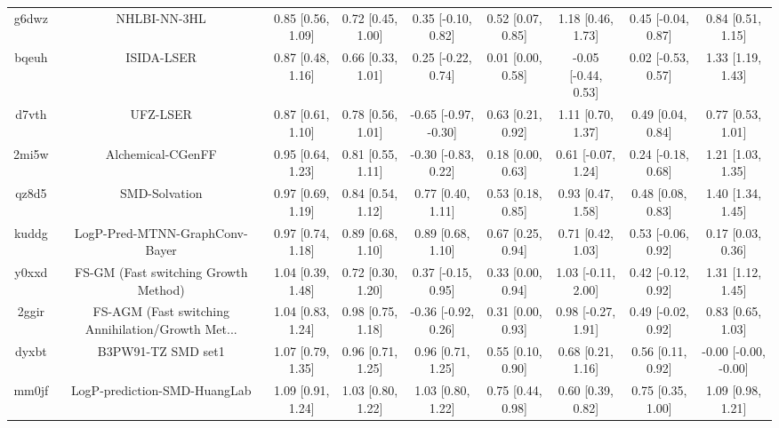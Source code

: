 \documentclass{article}
\begin{document}
\begin{center}
\begin{longtable}{|ccccccccc|}
 g6dwz &                                       NHLBI-NN-3HL &  0.85 [0.56, 1.09] &  0.72 [0.45, 1.00] &    0.35 [-0.10, 0.82] &  0.52 [0.07, 0.85] &    1.18 [0.46, 1.73] &   0.45 [-0.04, 0.87] &     0.84 [0.51, 1.15] \\
 bqeuh &                                         ISIDA-LSER &  0.87 [0.48, 1.16] &  0.66 [0.33, 1.01] &    0.25 [-0.22, 0.74] &  0.01 [0.00, 0.58] &  -0.05 [-0.44, 0.53] &   0.02 [-0.53, 0.57] &     1.33 [1.19, 1.43] \\
 d7vth &                                           UFZ-LSER &  0.87 [0.61, 1.10] &  0.78 [0.56, 1.01] &  -0.65 [-0.97, -0.30] &  0.63 [0.21, 0.92] &    1.11 [0.70, 1.37] &    0.49 [0.04, 0.84] &     0.77 [0.53, 1.01] \\
 2mi5w &                                  Alchemical-CGenFF &  0.95 [0.64, 1.23] &  0.81 [0.55, 1.11] &   -0.30 [-0.83, 0.22] &  0.18 [0.00, 0.63] &   0.61 [-0.07, 1.24] &   0.24 [-0.18, 0.68] &     1.21 [1.03, 1.35] \\
 qz8d5 &                                      SMD-Solvation &  0.97 [0.69, 1.19] &  0.84 [0.54, 1.12] &     0.77 [0.40, 1.11] &  0.53 [0.18, 0.85] &    0.93 [0.47, 1.58] &    0.48 [0.08, 0.83] &     1.40 [1.34, 1.45] \\
 kuddg &                     LogP-Pred-MTNN-GraphConv-Bayer &  0.97 [0.74, 1.18] &  0.89 [0.68, 1.10] &     0.89 [0.68, 1.10] &  0.67 [0.25, 0.94] &    0.71 [0.42, 1.03] &   0.53 [-0.06, 0.92] &     0.17 [0.03, 0.36] \\
 y0xxd &               FS-GM (Fast switching Growth Method) &  1.04 [0.39, 1.48] &  0.72 [0.30, 1.20] &    0.37 [-0.15, 0.95] &  0.33 [0.00, 0.94] &   1.03 [-0.11, 2.00] &   0.42 [-0.12, 0.92] &     1.31 [1.12, 1.45] \\
 2ggir &  FS-AGM (Fast switching Annihilation/Growth Met... &  1.04 [0.83, 1.24] &  0.98 [0.75, 1.18] &   -0.36 [-0.92, 0.26] &  0.31 [0.00, 0.93] &   0.98 [-0.27, 1.91] &   0.49 [-0.02, 0.92] &     0.83 [0.65, 1.03] \\
 dyxbt &                                 B3PW91-TZ SMD set1 &  1.07 [0.79, 1.35] &  0.96 [0.71, 1.25] &     0.96 [0.71, 1.25] &  0.55 [0.10, 0.90] &    0.68 [0.21, 1.16] &    0.56 [0.11, 0.92] &  -0.00 [-0.00, -0.00] \\
 mm0jf &                       LogP-prediction-SMD-HuangLab &  1.09 [0.91, 1.24] &  1.03 [0.80, 1.22] &     1.03 [0.80, 1.22] &  0.75 [0.44, 0.98] &    0.60 [0.39, 0.82] &    0.75 [0.35, 1.00] &     1.09 [0.98, 1.21] \\

\end{longtable}
\end{center}
\end{document}
